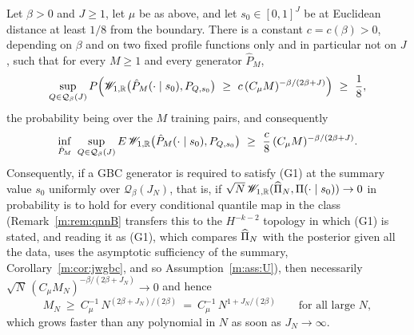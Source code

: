 \begin{theorem}\label{m:thm:qnnB}
Let $\beta>0$ and $J\ge1$, let $\mu$ be as above, and let $s_0\in[0,1]^J$ be at Euclidean distance at least $1/8$ from the boundary. There is a constant $c=c(\beta)>0$, depending on $\beta$ and on two fixed profile functions only and in particular not on $J$, such that for every $M\ge1$ and every generator $\hat P_M$,
\[
\sup_{Q\in\mathcal Q_\beta(J)}P\Big(\Wone_{1,\R}\big(\hat P_M(\cdot\mid s_0),P_{Q,s_0}\big)\ \ge\ c\,(C_\mu M)^{-\beta/(2\beta+J)}\Big)\ \ge\ \frac18 ,
\]
the probability being over the $M$ training pairs, and consequently
\[
\inf_{\hat P_M}\ \sup_{Q\in\mathcal Q_\beta(J)}E\,\mathscr{W}_{1,\mathbb{R}}\big(\hat P_M(\cdot\mid s_0),P_{Q,s_0}\big)\ \ge\ \frac c8\,(C_\mu M)^{-\beta/(2\beta+J)} .
\]
Consequently, if a GBC generator is required to satisfy (G1) at the summary value $s_0$ uniformly over $\mathcal Q_\beta(J_N)$, that is, if $\sqrt N\,\mathscr{W}_{1,\mathbb{R}}(\widehat\Pi_N,\Pi(\cdot\mid s_0))\to0$ in probability is to hold for every conditional quantile map in the class (Remark~\ref{m:rem:qnnB} transfers this to the $H^{-k-2}$ topology in which (G1) is stated, and reading it as (G1), which compares $\widehat\Pi_N$ with the posterior given all the data, uses the asymptotic sufficiency of the summary, Corollary~\ref{m:cor:jwgbc}, and so Assumption~\ref{m:ass:U}), then necessarily $\sqrt N\,(C_\mu M_N)^{-\beta/(2\beta+J_N)}\to0$ and hence
\[
M_N\ \ge\ C_\mu^{-1}\,N^{(2\beta+J_N)/(2\beta)}\ =\ C_\mu^{-1}\,N^{1+J_N/(2\beta)}\qquad\text{for all large }N ,
\]
which grows faster than any polynomial in $N$ as soon as $J_N\to\infty$.
\end{theorem}

